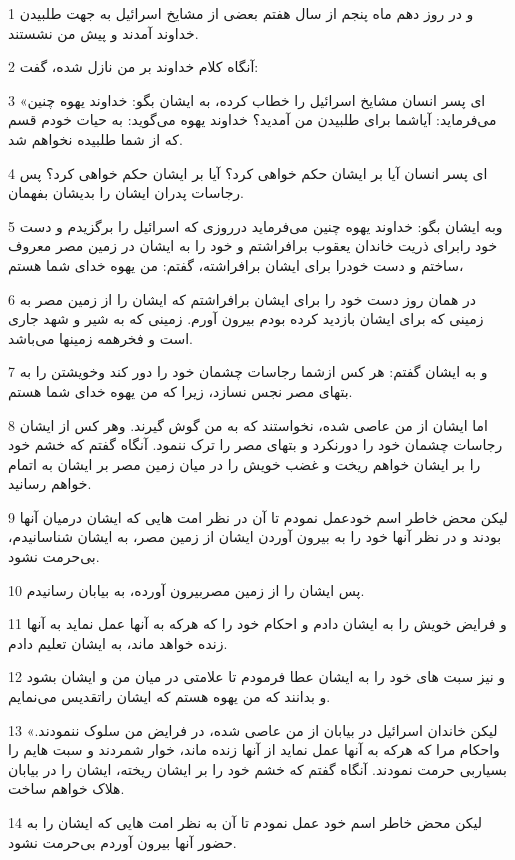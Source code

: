 \par 1 و در روز دهم ماه پنجم از سال هفتم بعضی از مشایخ اسرائیل به جهت طلبیدن خداوند آمدند و پیش من نشستند.
\par 2 آنگاه کلام خداوند بر من نازل شده، گفت:
\par 3 «ای پسر انسان مشایخ اسرائیل را خطاب کرده، به ایشان بگو: خداوند یهوه چنین می‌فرماید: آیاشما برای طلبیدن من آمدید؟ خداوند یهوه می‌گوید: به حیات خودم قسم که از شما طلبیده نخواهم شد.
\par 4 ‌ای پسر انسان آیا بر ایشان حکم خواهی کرد؟ آیا بر ایشان حکم خواهی کرد؟ پس رجاسات پدران ایشان را بدیشان بفهمان.
\par 5 وبه ایشان بگو: خداوند یهوه چنین می‌فرماید درروزی که اسرائیل را برگزیدم و دست خود رابرای ذریت خاندان یعقوب برافراشتم و خود را به ایشان در زمین مصر معروف ساختم و دست خودرا برای ایشان برافراشته، گفتم: من یهوه خدای شما هستم،
\par 6 در همان روز دست خود را برای ایشان برافراشتم که ایشان را از زمین مصر به زمینی که برای ایشان بازدید کرده بودم بیرون آورم. زمینی که به شیر و شهد جاری است و فخرهمه زمینها می‌باشد.
\par 7 و به ایشان گفتم: هر کس ازشما رجاسات چشمان خود را دور کند وخویشتن را به بتهای مصر نجس نسازد، زیرا که من یهوه خدای شما هستم.
\par 8 اما ایشان از من عاصی شده، نخواستند که به من گوش گیرند. وهر کس از ایشان رجاسات چشمان خود را دورنکرد و بتهای مصر را ترک ننمود. آنگاه گفتم که خشم خود را بر ایشان خواهم ریخت و غضب خویش را در میان زمین مصر بر ایشان به اتمام خواهم رسانید.
\par 9 لیکن محض خاطر اسم خودعمل نمودم تا آن در نظر امت هایی که ایشان درمیان آنها بودند و در نظر آنها خود را به بیرون آوردن ایشان از زمین مصر، به ایشان شناسانیدم، بی‌حرمت نشود.
\par 10 پس ایشان را از زمین مصربیرون آورده، به بیابان رسانیدم.
\par 11 و فرایض خویش را به ایشان دادم و احکام خود را که هر‌که به آنها عمل نماید به آنها زنده خواهد ماند، به ایشان تعلیم دادم.
\par 12 و نیز سبت های خود را به ایشان عطا فرمودم تا علامتی در میان من و ایشان بشود و بدانند که من یهوه هستم که ایشان راتقدیس می‌نمایم.
\par 13 «لیکن خاندان اسرائیل در بیابان از من عاصی شده، در فرایض من سلوک ننمودند. واحکام مرا که هر‌که به آنها عمل نماید از آنها زنده ماند، خوار شمردند و سبت هایم را بسیاربی حرمت نمودند. آنگاه گفتم که خشم خود را بر ایشان ریخته، ایشان را در بیابان هلاک خواهم ساخت.
\par 14 لیکن محض خاطر اسم خود عمل نمودم تا آن به نظر امت هایی که ایشان را به حضور آنها بیرون آوردم بی‌حرمت نشود.
